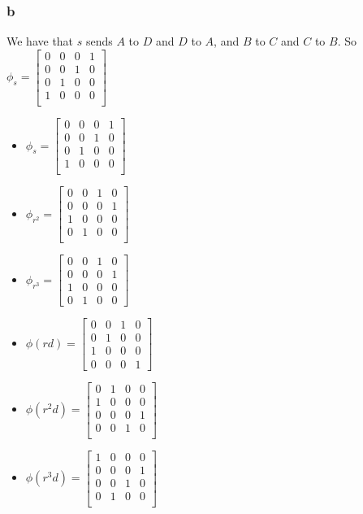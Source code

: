 \documentclass[]{article}
\begin{document}
\subsubsection{b}
We have that $s$ sends $A$ to $D$ and $D$ to $A$, and $B$ to $C$ and $C$ to $B$.
So $\phi_s = 
\begin{bmatrix}
	0 & 0 & 0 & 1\\
	0 & 0 & 1 &0 \\
	0 & 1 & 0 & 0 \\
	1 & 0 & 0 & 0\\
\end{bmatrix}$
\begin{itemize}
	\item $\phi_s = 
		\begin{bmatrix}
			0 & 0 & 0 & 1\\
			0 & 0 & 1 &0 \\
			0 & 1 & 0 & 0 \\
			1 & 0 & 0 & 0\\
		\end{bmatrix}$
	\item $\phi_{r^2} = 
		\begin{bmatrix}
			0 & 0 & 1 & 0\\
			0 & 0 & 0 & 1 \\
			1 & 0 & 0 & 0 \\
			0 & 1 & 0 & 0\\
		\end{bmatrix}$
	\item $\phi_{r^3} = 
		\begin{bmatrix}
			0 & 0 & 1 & 0 \\
			0 & 0 & 0 & 1 \\
			1 & 0 & 0 & 0 \\
			0 & 1 & 0 & 0
		\end{bmatrix}$
	\item $\phi(rd) = 
	\begin{bmatrix}
		0 & 0 & 1 & 0 \\
		0 & 1 & 0 & 0 \\
		1 & 0 & 0 & 0 \\
		0 & 0 & 0 & 1
	\end{bmatrix}$
	\item 
$\phi(r^2 d) = 
\begin{bmatrix}
	0 &  1 & 0 & 0\\
	1 & 0 & 0 & 0 \\
	0 & 0 & 0 & 1 \\
	0 & 0 & 1 & 0\\
\end{bmatrix}$
	\item 
$\phi(r^3 d) = 
\begin{bmatrix}
	1 &  0 & 0 & 0\\
	0 & 0 & 0 & 1 \\
	0 & 0 & 1 & 0 \\
	0 & 1 & 0 & 0\\
\end{bmatrix}$
\end{itemize}
\end{document}
